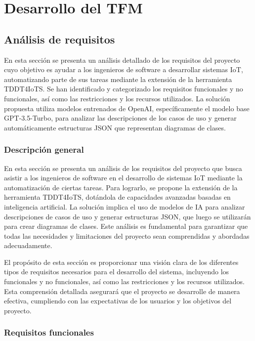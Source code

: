 \chapter{Desarrollo del TFM}\label{chapter:desarrollo}

\section{Análisis de requisitos}

En esta sección se presenta un análisis detallado de los requisitos del proyecto cuyo objetivo es ayudar a los ingenieros de software a desarrollar sistemas IoT, automatizando parte de sus tareas mediante la extensión de la herramienta TDDT4IoTS. Se han identificado y categorizado los requisitos funcionales y no funcionales, así como las restricciones y los recursos utilizados. La solución propuesta utiliza modelos entrenados de OpenAI, específicamente el modelo base GPT-3.5-Turbo, para analizar las descripciones de los casos de uso y generar automáticamente estructuras JSON que representan diagramas de clases.

\subsection{Descripción general}

En esta sección se presenta un análisis de los requisitos del proyecto que busca asistir a los ingenieros de software en el desarrollo de sistemas IoT mediante la automatización de ciertas tareas. Para lograrlo, se propone la extensión de la herramienta TDDT4IoTS, dotándola de capacidades avanzadas basadas en inteligencia artificial. La solución implica el uso de modelos de IA para analizar descripciones de casos de uso y generar estructuras JSON, que luego se utilizarán para crear diagramas de clases. Este análisis es fundamental para garantizar que todas las necesidades y limitaciones del proyecto sean comprendidas y abordadas adecuadamente.

El propósito de esta sección es proporcionar una visión clara de los diferentes tipos de requisitos necesarios para el desarrollo del sistema, incluyendo los funcionales y no funcionales, así como las restricciones y los recursos utilizados. Esta comprensión detallada asegurará que el proyecto se desarrolle de manera efectiva, cumpliendo con las expectativas de los usuarios y los objetivos del proyecto.

\subsection{Requisitos funcionales}

